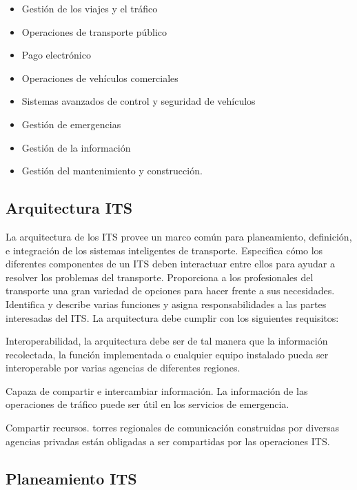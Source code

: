 \documentclass[final,fmstyle]{fpunathesis}
\begin{document}
\begin{itemize}
\item Gestión de los viajes y el tráfico

\item Operaciones de transporte público

\item Pago electrónico

\item Operaciones de vehículos comerciales

\item Sistemas avanzados de control y seguridad de vehículos

\item Gestión de emergencias

\item Gestión de la información

\item Gestión del mantenimiento y construcción.
\end{itemize}

\subsection{Arquitectura ITS}

La arquitectura de los ITS provee un marco común para planeamiento, definición, e integración de los sistemas inteligentes de transporte. Especifica cómo los diferentes componentes de un ITS deben interactuar entre ellos para ayudar a resolver los problemas del transporte. Proporciona a los profesionales del transporte una gran variedad de opciones para hacer frente a sus necesidades. Identifica y describe varias funciones y asigna responsabilidades a las partes interesadas del ITS. La arquitectura debe cumplir con los siguientes requisitos:

Interoperabilidad, la arquitectura debe ser de tal manera que la información recolectada, la función implementada o cualquier equipo instalado pueda ser interoperable por varias agencias de diferentes regiones.

Capaza de compartir e intercambiar información. La información de las operaciones de tráfico puede ser útil en los servicios de emergencia.

Compartir recursos. torres regionales de comunicación construidas por diversas agencias privadas están obligadas a ser compartidas por las operaciones ITS.

\subsection{Planeamiento ITS}
\end{document}
